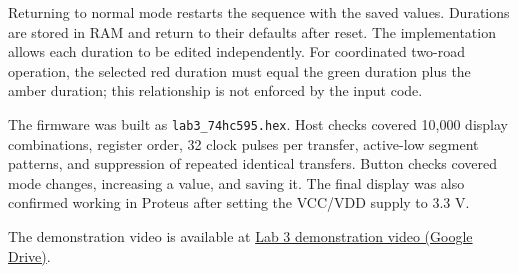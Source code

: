 \documentclass[12pt,a4paper]{article}
\begin{document}
Returning to normal mode restarts the sequence with the saved values. Durations
are stored in RAM and return to their defaults after reset. The implementation
allows each duration to be edited independently. For coordinated two-road
operation, the selected red duration must equal the green duration plus the
amber duration; this relationship is not enforced by the input code.

The firmware was built as \texttt{lab3\_74hc595.hex}. Host checks covered
10,000 display combinations, register order, 32 clock pulses per transfer,
active-low segment patterns, and suppression of repeated identical transfers.
Button checks covered mode changes, increasing a value, and saving it.
The final display was also confirmed working in Proteus after setting the
VCC/VDD supply to 3.3 V.

The demonstration video is available at
\href{https://drive.google.com/file/d/1mSy8i7v73HCMJG2kQaJ_mmHTSjQvnKNP/view?usp=sharing}{Lab 3 demonstration video (Google Drive)}.
\end{document}
